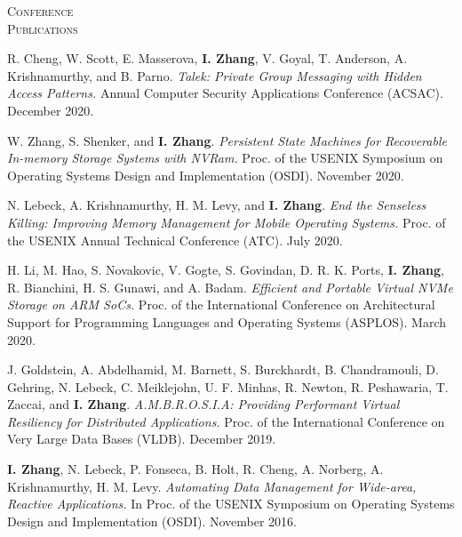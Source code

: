 \documentclass[10pt,times]{report}
\newlength{\sectiongap}
\newlength{\sectioncolwidth}
\newlength{\colgap}
\newlength{\stuffwidth}
\newenvironment{rtable}{
  \begin{minipage}{\textwidth}
  }{
  \end{minipage}
}
\newenvironment{rsection}[1]{
  \begin{minipage}[t]{\sectioncolwidth}
    \textsc{#1}
  \end{minipage}
  \hspace{\colgap}
  \begin{minipage}[t]{\stuffwidth}
  }{
    \removelastskip
  \end{minipage}
  \\[\sectiongap]
}
\begin{document}
\begin{rtable}
\begin{rsection}{Conference\\Publications}
    R. Cheng, W. Scott, E. Masserova, \textbf{I. Zhang}, V. Goyal,
    T. Anderson, A. Krishnamurthy, and B. Parno. \textit{Talek:
      Private Group Messaging with Hidden Access Patterns.} Annual
    Computer Security Applications Conference (ACSAC). December
    2020. \\\vspace{-0.5em}

    W. Zhang, S. Shenker, and \textbf{I. Zhang}.  \textit{Persistent
      State Machines for Recoverable In-memory Storage Systems with
      NVRam.}  Proc. of the USENIX Symposium on Operating
    Systems Design and Implementation (OSDI). November
    2020. \\\vspace{-0.5em}
    
    N. Lebeck, A. Krishnamurthy, H. M. Levy, and
    \textbf{I. Zhang}. \textit{End the Senseless Killing: Improving
      Memory Management for Mobile Operating Systems.}  Proc. of
    the USENIX Annual Technical Conference (ATC). July
    2020. \\\vspace{-0.5em}

    H. Li, M. Hao, S. Novakovic, V. Gogte, S. Govindan,
    D. R. K. Ports, \textbf{I. Zhang}, R. Bianchini, H. S. Gunawi, and
    A. Badam. \textit{ Efficient and Portable Virtual NVMe Storage on
      ARM SoCs.}  Proc. of the International Conference on
    Architectural Support for Programming Languages and Operating
    Systems (ASPLOS). March 2020.\\\vspace{-0.5em}
    
    J. Goldstein, A. Abdelhamid, M. Barnett, S. Burckhardt,
    B. Chandramouli, D. Gehring, N. Lebeck, C.  Meiklejohn,
    U. F. Minhas, R. Newton, R. Peshawaria, T.  Zaccai, and
    \textbf{I. Zhang}.  \textit{ A.M.B.R.O.S.I.A: Providing Performant
      Virtual Resiliency for Distributed Applications.} Proc. of
    the International Conference on Very Large Data Bases (VLDB).
    December 2019. \\\vspace{-0.5em}

    \textbf{I. Zhang}, N. Lebeck, P. Fonseca, B. Holt, R. Cheng,
    A. Norberg, A. Krishnamurthy, H.  M. Levy. \textit{Automating Data
      Management for Wide-area, Reactive Applications.}  In
    Proc. of the USENIX Symposium on Operating Systems Design
    and Implementation (OSDI). November 2016.\\\vspace{-0.5em}


\end{rsection}
\end{rtable}
\end{document}
